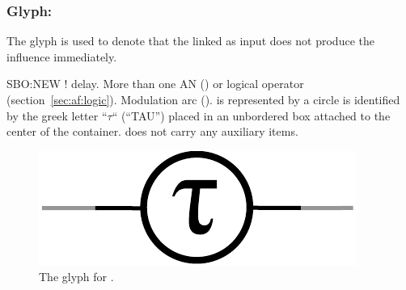 
\subsubsection{Glyph: }\label{sec:delay}

The glyph  is used to denote that the  linked as input does not produce the influence immediately.

\begin{glyphDescription}
 \glyphSboTerm SBO:NEW ! delay.
 \glyphOrigin More than one AN () or logical operator (section~\ref{sec:af:logic}).
 \glyphTarget  Modulation arc ().
 \glyphContainer {} is represented by a circle
 \glyphLabel {} is identified by the greek letter ``$\tau$`` (``TAU'') placed in an unbordered box attached to the center of the container.
 \glyphAux {} does not carry any auxiliary items.
\end{glyphDescription}

\begin{figure}[H]
  \centering
  \includegraphics[scale = 0.5]{images/delay}
  \caption{The \ER glyph for .}
  \label{fig:delay}
\end{figure}
\normalcolor
